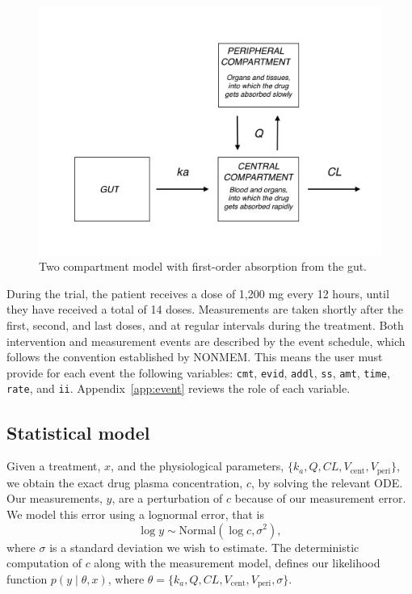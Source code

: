 \begin{figure}
  \begin{center}
  \includegraphics[width=5in]{../figures/TwoCptNice.png}
  \caption{Two compartment model with first-order absorption from the gut.}
  \label{fig:twocpt}
  \end{center}
\end{figure}

During the trial, the patient receives a dose of 1,200 mg every 12 hours, until they have received a total of 14 doses.
Measurements are taken shortly after the first, second, and last doses, and at regular intervals during the treatment.
Both intervention and measurement events are described by the event schedule, which follows the convention established by NONMEM.
This means the user must provide for each event the following variables: \texttt{cmt}, \texttt{evid}, \texttt{addl}, \texttt{ss}, \texttt{amt}, \texttt{time}, \texttt{rate}, and \texttt{ii}.
Appendix~\ref{app:event} reviews the role of each variable.

\subsection{Statistical model}

Given a treatment, $x$, and the physiological parameters, $\{ k_a, Q, CL, V_\mathrm{cent}, V_\mathrm{peri} \}$, we obtain the exact drug plasma concentration, $c$, by solving the relevant ODE.
Our measurements, $y$, are a perturbation of $c$ because of our measurement error.
We model this error using a lognormal error, that is
\begin{equation*}
  \log y \sim \mathrm{Normal}(\log c, \sigma^2),
\end{equation*}
where $\sigma$ is a standard deviation we wish to estimate.
The deterministic computation of $c$ along with the measurement model, defines our likelihood function $p(y \mid \theta, x)$, where $\theta = \{ k_a, Q, CL, V_\mathrm{cent}, V_\mathrm{peri}, \sigma \}$.

